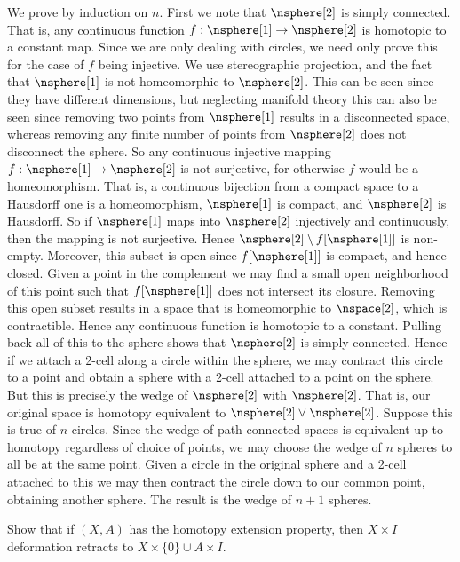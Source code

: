 \documentclass{book}                                                           %
\begin{document}
\begin{solution}
    We prove by induction on $n$. First we note that $\nsphere[2]$ is
    simply connected. That is, any continuous function
    $f:\nsphere[1]\rightarrow\nsphere[2]$ is homotopic to a constant map.
    Since we are only dealing with circles, we need only prove this for the
    case of $f$ being injective. We use stereographic projection, and the
    fact that $\nsphere[1]$ is not homeomorphic to $\nsphere[2]$. This can
    be seen since they have different dimensions, but neglecting manifold
    theory this can also be seen since removing two points from
    $\nsphere[1]$ results in a disconnected space, whereas removing any
    finite number of points from
    $\nsphere[2]$ does not disconnect the sphere. So any continuous
    injective mapping $f:\nsphere[1]\rightarrow\nsphere[2]$ is not
    surjective, for otherwise $f$ would be a homeomorphism. That is, a
    continuous bijection from a compact space to a Hausdorff one is a
    homeomorphism, $\nsphere[1]$ is compact, and $\nsphere[2]$ is Hausdorff.
    So if $\nsphere[1]$ maps into $\nsphere[2]$ injectively and
    continuously, then the mapping is not surjective. Hence
    $\nsphere[2]\setminus{f}[\nsphere[1]]$ is non-empty. Moreover, this
    subset is open since $f[\nsphere[1]]$ is compact, and hence closed.
    Given a point in the complement we may find a small open neighborhood of
    this point such that $f[\nsphere[1]]$ does not intersect its closure.
    Removing this open subset results in a space that is homeomorphic to
    $\nspace[2]$, which is contractible. Hence any continuous function is
    homotopic to a constant. Pulling back all of this to the sphere shows
    that $\nsphere[2]$ is simply connected. Hence if we attach a 2-cell
    along a circle within the sphere, we may contract this circle to a point
    and obtain a sphere with a 2-cell attached to a point on the sphere.
    But this is precisely the wedge of $\nsphere[2]$ with $\nsphere[2]$.
    That is, our original space is homotopy equivalent to
    $\nsphere[2]\lor\nsphere[2]$. Suppose this is true of $n$ circles.
    Since the wedge of path connected spaces is equivalent up to homotopy
    regardless of choice of points, we may choose the wedge of $n$ spheres
    to all be at the same point. Given a circle in the original sphere and a
    2-cell attached to this we may then contract the circle down to our
    common point, obtaining another sphere. The result is the wedge of $n+1$
    spheres.
\end{solution}
\begin{problem}
    Show that if $(X,A)$ has the homotopy extension property, then
    $X\times{I}$ deformation retracts to $X\times\{0\}\cup{A}\times{I}$.
\end{problem}
\end{document}
